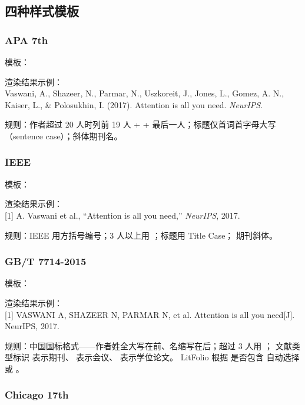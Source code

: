 \subsection{四种样式模板}

\subsubsection{APA 7th}

模板：

渲染结果示例：\\
Vaswani, A., Shazeer, N., Parmar, N., Uszkoreit, J., Jones, L., Gomez, A. N.,
Kaiser, L., \& Polosukhin, I. (2017). Attention is all you need. \textit{NeurIPS}.

规则：作者超过 20 人时列前 19 人 +  + 最后一人；标题仅首词首字母大写
（sentence case）；斜体期刊名。

\subsubsection{IEEE}

模板：

渲染结果示例：\\
{[}1{]} A. Vaswani et al., ``Attention is all you need,'' \textit{NeurIPS}, 2017.

规则：IEEE 用方括号编号；3 人以上用 ；标题用 Title Case；
期刊斜体。

\subsubsection{GB/T 7714-2015}

模板：

渲染结果示例：\\
{[}1{]} VASWANI A, SHAZEER N, PARMAR N, et al. Attention is all you need[J].
NeurIPS, 2017.

规则：中国国标格式——作者姓全大写在前、名缩写在后；超过 3 人用 ；
文献类型标识 \cmd{[J]} 表示期刊、\cmd{[C]} 表示会议、\cmd{[D]} 表示学位论文。
LitFolio 根据  是否包含 
自动选择 \cmd{[J]} 或 \cmd{[C]}。

\subsubsection{Chicago 17th}

